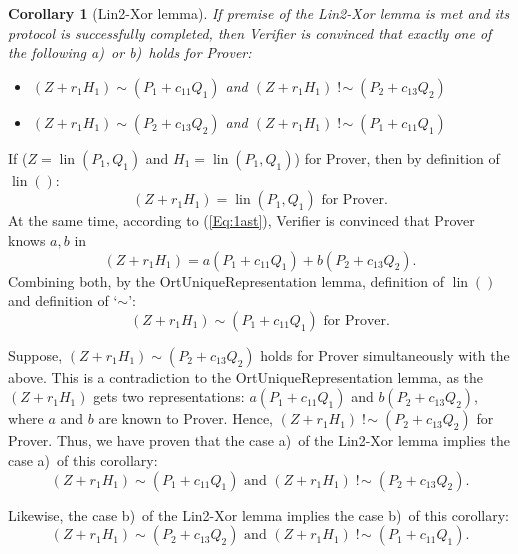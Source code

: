 \documentclass{mathcryptology} %
\DeclareMathOperator{\notsim}{!\!\sim}
\DeclareMathOperator{\lin}{lin}
\theoremstyle{title}
\theoremstyle{titleof}
\newtheorem*{titlecorollary}{Corollary}
\renewenvironment{proof}{\noindent{\bfseries Proof:} }{}
\begin{document}
    \begin{titlecorollary}[Lin2-Xor lemma]
        If premise of the Lin2-Xor lemma is met and its protocol is successfully completed, then Verifier is convinced that exactly one of the following a)~or b)~holds for Prover:
        \begin{itemize}
            \item[a)] $\left(Z+r_{1} H_{1}\right) \sim \left(P_{1} + c_{11} Q_{1}\right)$    and $\left(Z+r_{1}H_{1}\right)\notsim \left(P_{2}+c_{13}Q_{2}\right)$
            \item[b)] $\left(Z+r_{1} H_{1}\right) \sim \left(P_{2}+c_{13}Q_{2}\right)$ and $\left(Z+r_{1}H_{1}\right)\notsim \left(P_{1}+c_{11}Q_{1}\right)$
        \end{itemize}
    \end{titlecorollary}
    \begin{proof}
        If ($Z=\lin\left(P_{1}, Q_{1}\right)$ and $H_{1}=\lin\left(P_{1}, Q_{1}\right)$) for Prover, then by definition of $\lin()$:
        \begin{equation*}
            \left(Z+r_{1} H_{1}\right) = \lin\left(P_{1}, Q_{1}\right) \text{ for Prover.}
        \end{equation*}
        At the same time, according to (\ref{Eq:1ast}), Verifier is convinced that Prover knows $a, b$ in
        \begin{equation*}
            \left(Z+r_{1}H_{1}\right)=a\left(P_{1}+c_{11}Q_{1}\right)+b\left(P_{2}+c_{13}Q_{2}\right).
        \end{equation*}
        Combining both, by the OrtUniqueRepresentation lemma, definition of $\lin()$ and definition of `$\sim$':
        \begin{equation*}
            \left(Z+r_{1} H_{1}\right) \sim \left(P_{1}+c_{11}Q_{1}\right) \text{ for Prover.}
        \end{equation*}
        
        Suppose, $\left(Z+r_{1} H_{1}\right) \sim \left(P_{2}+c_{13}Q_{2}\right)$ holds for Prover simultaneously with the above. This is a contradiction to the OrtUniqueRepresentation lemma, as the $\left(Z+r_{1}H_{1}\right)$ gets two representations: $a\left(P_{1}+c_{11}Q_{1}\right)$ and $b\left(P_{2}+c_{13}Q_{2}\right)$, where $a$ and $b$ are known to Prover. Hence, $\left(Z+r_{1}H_{1}\right)\notsim \left(P_{2}+c_{13}Q_{2}\right)$ for Prover.
        Thus, we have proven that the case a)~of the Lin2-Xor lemma implies the case a)~of this corollary:
        \begin{equation*}
            \left(Z+r_{1} H_{1}\right) \sim \left(P_{1}+c_{11}Q_{1}\right) \text{ and } \left(Z+r_{1}H_{1}\right)\notsim \left(P_{2}+c_{13}Q_{2}\right).
        \end{equation*}
        
        Likewise, the case b)~of the Lin2-Xor lemma implies the case b)~of this corollary:
        \begin{equation*}
            \left(Z+r_{1}H_{1}\right) \sim \left(P_{2}+c_{13}Q_{2}\right) \text{ and } \left(Z+r_{1}H_{1}\right)\notsim \left(P_{1}+c_{11}Q_{1}\right).
        \end{equation*}
    \end{proof}
\end{document}
